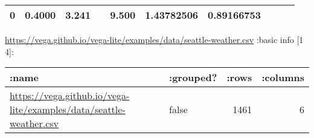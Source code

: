 \documentclass[]{article}
\begin{document}
\begin{longtable}[]{@{}llrrllllrr@{}}
\begin{minipage}[t]{0.07\columnwidth}
0\strut
\end{minipage} & \begin{minipage}[t]{0.07\columnwidth}\raggedright\strut
0.4000\strut
\end{minipage} & \begin{minipage}[t]{0.07\columnwidth}\raggedright\strut
3.241\strut
\end{minipage} & \begin{minipage}[t]{0.04\columnwidth}\raggedright\strut
\strut
\end{minipage} & \begin{minipage}[t]{0.07\columnwidth}\raggedright\strut
9.500\strut
\end{minipage} & \begin{minipage}[t]{0.11\columnwidth}\raggedleft\strut
1.43782506\strut
\end{minipage} & \begin{minipage}[t]{0.07\columnwidth}\raggedleft\strut
0.89166753\strut
\end{minipage}\tabularnewline
\bottomrule
\end{longtable}

\url{https://vega.github.io/vega-lite/examples/data/seattle-weather.csv}
:basic info {[}1 4{]}:

\begin{longtable}[]{@{}llrr@{}}
\toprule
\begin{minipage}[b]{0.61\columnwidth}\raggedright\strut
:name\strut
\end{minipage} & \begin{minipage}[b]{0.11\columnwidth}\raggedright\strut
:grouped?\strut
\end{minipage} & \begin{minipage}[b]{0.07\columnwidth}\raggedleft\strut
:rows\strut
\end{minipage} & \begin{minipage}[b]{0.10\columnwidth}\raggedleft\strut
:columns\strut
\end{minipage}\tabularnewline
\midrule
\endhead
\begin{minipage}[t]{0.61\columnwidth}\raggedright\strut
\url{https://vega.github.io/vega-lite/examples/data/seattle-weather.csv}\strut
\end{minipage} & \begin{minipage}[t]{0.11\columnwidth}\raggedright\strut
false\strut
\end{minipage} & \begin{minipage}[t]{0.07\columnwidth}\raggedleft\strut
1461\strut
\end{minipage} & \begin{minipage}[t]{0.10\columnwidth}\raggedleft\strut
6\strut
\end{minipage}\tabularnewline
\bottomrule
\end{longtable}
\end{document}
